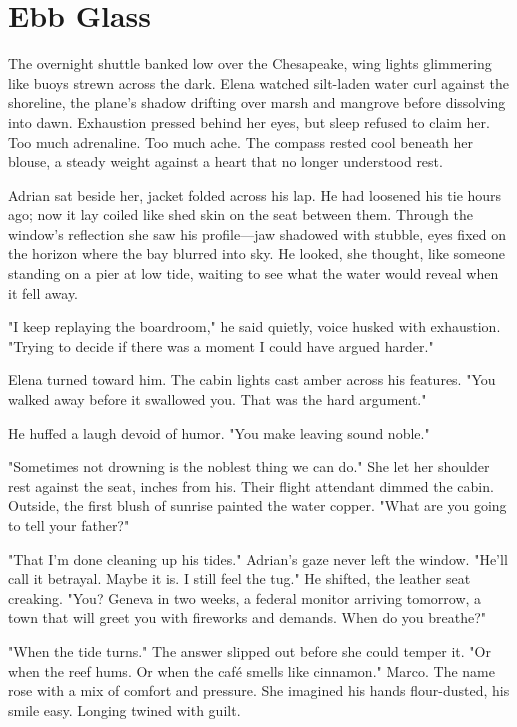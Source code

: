 \chapter{Ebb Glass}

The overnight shuttle banked low over the Chesapeake, wing lights glimmering like buoys strewn across the dark. Elena watched silt-laden water curl against the shoreline, the plane's shadow drifting over marsh and mangrove before dissolving into dawn. Exhaustion pressed behind her eyes, but sleep refused to claim her. Too much adrenaline. Too much ache. The compass rested cool beneath her blouse, a steady weight against a heart that no longer understood rest.

Adrian sat beside her, jacket folded across his lap. He had loosened his tie hours ago; now it lay coiled like shed skin on the seat between them. Through the window's reflection she saw his profile—jaw shadowed with stubble, eyes fixed on the horizon where the bay blurred into sky. He looked, she thought, like someone standing on a pier at low tide, waiting to see what the water would reveal when it fell away.

"I keep replaying the boardroom," he said quietly, voice husked with exhaustion. "Trying to decide if there was a moment I could have argued harder."

Elena turned toward him. The cabin lights cast amber across his features. "You walked away before it swallowed you. That was the hard argument."

He huffed a laugh devoid of humor. "You make leaving sound noble."

"Sometimes not drowning is the noblest thing we can do." She let her shoulder rest against the seat, inches from his. Their flight attendant dimmed the cabin. Outside, the first blush of sunrise painted the water copper. "What are you going to tell your father?"

"That I'm done cleaning up his tides." Adrian's gaze never left the window. "He'll call it betrayal. Maybe it is. I still feel the tug." He shifted, the leather seat creaking. "You? Geneva in two weeks, a federal monitor arriving tomorrow, a town that will greet you with fireworks and demands. When do you breathe?"

"When the tide turns." The answer slipped out before she could temper it. "Or when the reef hums. Or when the café smells like cinnamon." Marco. The name rose with a mix of comfort and pressure. She imagined his hands flour-dusted, his smile easy. Longing twined with guilt.

